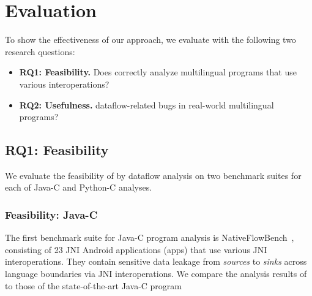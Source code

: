 \newcommand{\req}[1]{RQ#1}

\section{Evaluation}\label{sec:eval}



To show the effectiveness of our approach, we evaluate
\ours with the following two research questions:
\begin{itemize}
  \item \textbf{\req{1}: Feasibility.} Does \ours correctly analyze multilingual
    programs that use various interoperations?

  \item \textbf{\req{2}: Usefulness.}  dataflow-related
    bugs in real-world multilingual programs?
\end{itemize}

\subsection{\req{1}: Feasibility}
We evaluate the feasibility of \ours by dataflow analysis on
two benchmark suites for each of Java-C and Python-C analyses.

\subsubsection{Feasibility: Java-C}
The first benchmark suite for Java-C program analysis is NativeFlowBench~\cite{nativeflowbench, JN-SAF},
consisting of 23 JNI Android applications (apps) that use various JNI interoperations.
They contain sensitive data leakage from {\it sources} to {\it sinks}
across language boundaries via JNI interoperations.
We compare the analysis results of \ours to those of the state-of-the-art Java-C program

